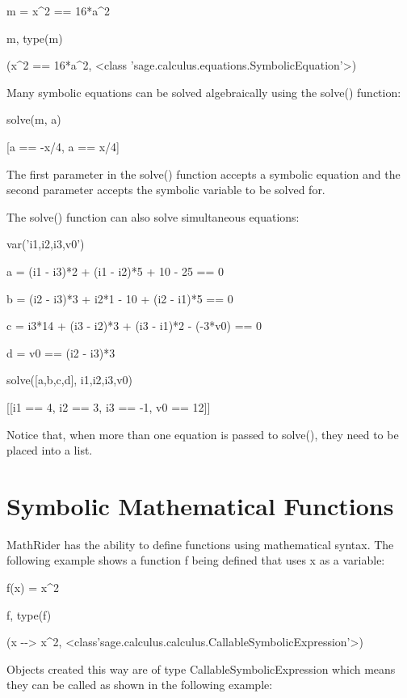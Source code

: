 \documentclass[12pt,oneside]{book}
\begin{document}
m = x\^{}2 == 16*a\^{}2

m, type(m)

{\textbar}

(x\^{}2 == 16*a\^{}2, {\textless}class 'sage.calculus.equations.SymbolicEquation'{\textgreater})

Many symbolic equations can be solved algebraically using the solve() function: 

solve(m, a)

{\textbar}

[a == {}-x/4, a == x/4]

The first parameter in the solve() function accepts a symbolic equation and the second parameter accepts the symbolic variable to be solved for. 

The solve() function can also solve simultaneous equations:


var('i1,i2,i3,v0')


a = (i1 {}- i3)*2 + (i1 {}- i2)*5 + 10 {}- 25 == 0

b = (i2 {}- i3)*3 + i2*1 {}- 10 + (i2 {}- i1)*5 == 0

c = i3*14 + (i3 {}- i2)*3 + (i3 {}- i1)*2 {}- ({}-3*v0) == 0

d = v0 == (i2 {}- i3)*3


solve([a,b,c,d], i1,i2,i3,v0)

{\textbar}

[[i1 == 4, i2 == 3, i3 == {}-1, v0 == 12]]

Notice that, when more than one equation is passed to solve(), they need to be placed into a list.

\section[Symbolic Mathematical Functions]{ Symbolic Mathematical Functions}

MathRider has the ability to define functions using mathematical syntax. The following example shows a function f being defined that uses x as a variable: 

f(x) = x\^{}2

f, type(f)

{\textbar}

(x {\textbar}{}-{}-{\textgreater} x\^{}2, {\textless}class'sage.calculus.calculus.CallableSymbolicExpression'{\textgreater})

Objects created this way are of type CallableSymbolicExpression which means they can be called as shown in the following example: 
\end{document}
